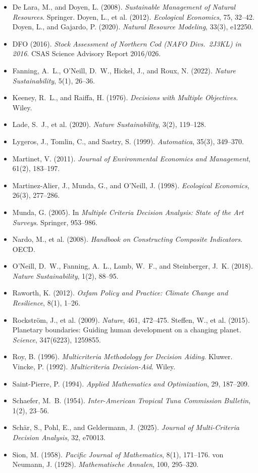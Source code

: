 \documentclass[preprint,11pt,authoryear]{elsarticle}
\theoremstyle{remark}
\begin{document}
\begin{itemize}[leftmargin=1.5em,itemsep=1pt]
\item De Lara, M., and Doyen, L. (2008). \emph{Sustainable Management of Natural Resources}. Springer. Doyen, L., et al. (2012). \emph{Ecological Economics}, 75, 32--42. Doyen, L., and Gajardo, P. (2020). \emph{Natural Resource Modeling}, 33(3), e12250.
\item DFO (2016). \emph{Stock Assessment of Northern Cod (NAFO Divs.\ 2J3KL) in 2016}. CSAS Science Advisory Report 2016/026.
\item Fanning, A.~L., O'Neill, D.~W., Hickel, J., and Roux, N. (2022). \emph{Nature Sustainability}, 5(1), 26--36.
\item Keeney, R.~L., and Raiffa, H. (1976). \emph{Decisions with Multiple Objectives}. Wiley.
\item Lade, S.~J., et al. (2020). \emph{Nature Sustainability}, 3(2), 119--128.
\item Lygeros, J., Tomlin, C., and Sastry, S. (1999). \emph{Automatica}, 35(3), 349--370.
\item Martinet, V. (2011). \emph{Journal of Environmental Economics and Management}, 61(2), 183--197.
\item Martinez-Alier, J., Munda, G., and O'Neill, J. (1998). \emph{Ecological Economics}, 26(3), 277--286.
\item Munda, G. (2005). In \emph{Multiple Criteria Decision Analysis: State of the Art Surveys}. Springer, 953--986.
\item Nardo, M., et al. (2008). \emph{Handbook on Constructing Composite Indicators}. OECD.
\item O'Neill, D.~W., Fanning, A.~L., Lamb, W.~F., and Steinberger, J.~K. (2018). \emph{Nature Sustainability}, 1(2), 88--95.
\item Raworth, K. (2012). \emph{Oxfam Policy and Practice: Climate Change and Resilience}, 8(1), 1--26.
\item Rockstr\"om, J., et al. (2009). \emph{Nature}, 461, 472--475. Steffen, W., et al. (2015). Planetary boundaries: Guiding human development on a changing planet. \emph{Science}, 347(6223), 1259855.
\item Roy, B. (1996). \emph{Multicriteria Methodology for Decision Aiding}. Kluwer. Vincke, P. (1992). \emph{Multicriteria Decision-Aid}. Wiley.
\item Saint-Pierre, P. (1994). \emph{Applied Mathematics and Optimization}, 29, 187--209.
\item Schaefer, M.~B. (1954). \emph{Inter-American Tropical Tuna Commission Bulletin}, 1(2), 23--56.
\item Sch\"ar, S., Pohl, E., and Geldermann, J. (2025). \emph{Journal of Multi-Criteria Decision Analysis}, 32, e70013.
\item Sion, M. (1958). \emph{Pacific Journal of Mathematics}, 8(1), 171--176. von Neumann, J. (1928). \emph{Mathematische Annalen}, 100, 295--320.
\end{itemize}
\end{document}

